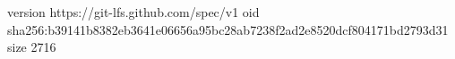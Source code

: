 version https://git-lfs.github.com/spec/v1
oid sha256:b39141b8382eb3641e06656a95bc28ab7238f2ad2e8520dcf804171bd2793d31
size 2716
